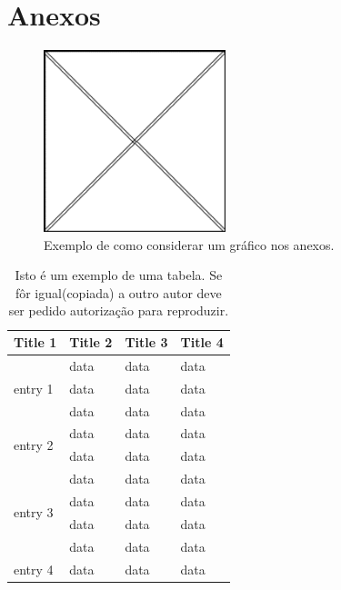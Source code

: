 \chapter{Anexos}

\begin{figure}[H]
\centering
\includegraphics[width=150pt, keepaspectratio]{Imagens/FigA.png}
\caption{Exemplo de como considerar um gráfico nos anexos.}
\label{fig:grafico1} %
\end{figure}

\setlength\tabcolsep{4pt}
\begin{table}[H]
\centering
\caption{Isto é um exemplo de uma tabela. Se fôr igual(copiada) a outro autor deve ser pedido autorização para reproduzir.}
\begin{tabular}{p{5cm}p{3.5cm}p{2cm}p{2cm}}
\toprule %
\textbf{Title 1} & \textbf{Title 2} & \textbf{Title 3} & \textbf{Title 4} \\ \hline
\multirow{3}{*}{entry 1}   & data      & data    & data             \\
                           & data      & data    & data             \\
                           & data      & data    & data             \\ \hline
\multirow{2}{*}{entry 2}   & data      & data    & data             \\
                           & data      & data    & data             \\ \hline
\multirow{4}{*}{entry 3}   & data      & data    & data             \\
                           & data      & data    & data             \\
                           & data      & data    & data             \\
                           & data      & data    & data             \\ \hline
entry 4                    & data      & data    & data             \\ \hline 
\end{tabular}
\end{table}